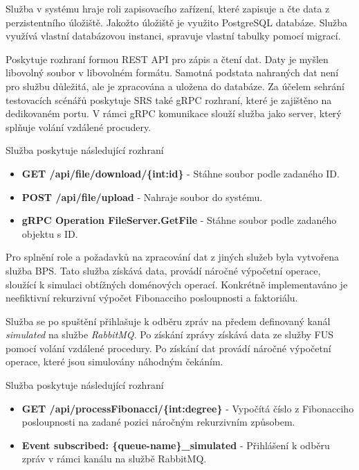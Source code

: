 
Služba v systému hraje roli zapisovacího zařízení, které zapisuje a čte data z perzistentního úložiště. Jakožto úložiště je využito PostgreSQL databáze. Služba využívá vlastní databázovou instanci, spravuje vlastní tabulky pomocí migrací.

Poskytuje rozhraní formou REST API pro zápis a čtení dat. Daty je myšlen libovolný soubor v libovolném formátu. Samotná podstata nahraných dat není pro službu důležitá, ale je zpracována a uložena do databáze. Za účelem sehrání testovacích scénářů poskytuje SRS také gRPC rozhraní, které je zajištěno na dedikovaném portu. V rámci gRPC komunikace slouží služba jako server, který splňuje volání vzdálené procudery.

Služba poskytuje následující rozhraní

\begin{itemize}
    \item \textbf{GET /api/file/download/\{int:id\}} - Stáhne soubor podle zadaného ID.
    \item \textbf{POST /api/file/upload} - Nahraje soubor do systému.
    \item \textbf{gRPC Operation FileServer.GetFile} - Stáhne soubor podle zadaného objektu s ID.
\end{itemize}


Pro splnění role a požadavků na zpracování dat z jiných služeb byla vytvořena služba BPS. Tato služba získává data, provádí náročné výpočetní operace, sloužící k simulaci obtížných doménových operací. Konkrétně implementaváno je neefiktivní rekurzivní výpočet Fibonacciho posloupnosti a faktoriálu.

Služba se po spuštění přihlašuje k odběru zpráv na předem definovaný kanál \emph{simulated} na službe \emph{RabbitMQ}. Po získání zprávy získává data ze služby FUS pomocí volání vzdálené procedury. Po získání dat provádí náročné výpočetní operace, které jsou simulovány náhodným čekáním.

Služba poskytuje následující rozhraní

\begin{itemize}
    \item \textbf{GET /api/processFibonacci/\{int:degree\}} - Vypočítá číslo z Fibonacciho posloupnosti na zadané pozici náročným rekurzivním způsobem.
    \item \textbf{Event subscribed: \{queue-name\}\_simulated} - Přihlášení k odběru zpráv v rámci kanálu na službě RabbitMQ.
\end{itemize}

